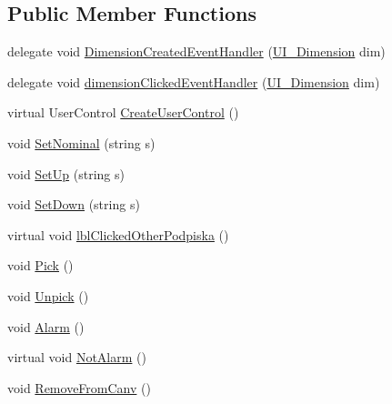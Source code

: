 \subsection*{Public Member Functions}
\begin{DoxyCompactItemize}
\item 
delegate void \mbox{\hyperlink{class_dimension___chain_1_1_u_i___dimension_a106096e0c35875f5fab0e7f22e0b5941}{Dimension\+Created\+Event\+Handler}} (\mbox{\hyperlink{class_dimension___chain_1_1_u_i___dimension}{U\+I\+\_\+\+Dimension}} dim)
\item 
delegate void \mbox{\hyperlink{class_dimension___chain_1_1_u_i___dimension_a45fef985621de3e250d8343eeeca3aed}{dimension\+Clicked\+Event\+Handler}} (\mbox{\hyperlink{class_dimension___chain_1_1_u_i___dimension}{U\+I\+\_\+\+Dimension}} dim)
\item 
virtual User\+Control \mbox{\hyperlink{class_dimension___chain_1_1_u_i___dimension_a7aff55d45ac01c21db9f45583fe5c51c}{Create\+User\+Control}} ()
\item 
void \mbox{\hyperlink{class_dimension___chain_1_1_u_i___dimension_a3e4e1d9c20e13324015ff92665916cd1}{Set\+Nominal}} (string s)
\item 
void \mbox{\hyperlink{class_dimension___chain_1_1_u_i___dimension_a085021a542b0342c1acb0b0f147f1d1a}{Set\+Up}} (string s)
\item 
void \mbox{\hyperlink{class_dimension___chain_1_1_u_i___dimension_a95aaf2a3e9eebd27a6de7c4c2613c362}{Set\+Down}} (string s)
\item 
virtual void \mbox{\hyperlink{class_dimension___chain_1_1_u_i___dimension_a13210c593c5bd0f5e7b59b93f6ec5fdc}{lbl\+Clicked\+Other\+Podpiska}} ()
\item 
void \mbox{\hyperlink{class_dimension___chain_1_1_u_i___dimension_ac655b429f2293b499eb3c597ebd74b95}{Pick}} ()
\item 
void \mbox{\hyperlink{class_dimension___chain_1_1_u_i___dimension_a8d3d92dd9e720171068d5c92220c5669}{Unpick}} ()
\item 
void \mbox{\hyperlink{class_dimension___chain_1_1_u_i___dimension_a3dc1cd92d14d6df43a6a15dd739aa155}{Alarm}} ()
\item 
virtual void \mbox{\hyperlink{class_dimension___chain_1_1_u_i___dimension_a4ab4c36c068571222229db5f0a194dd2}{Not\+Alarm}} ()
\item 
void \mbox{\hyperlink{class_dimension___chain_1_1_u_i___dimension_ae3e15f8c2a0c7b66f6346438a3eae72a}{Remove\+From\+Canv}} ()
\item 

\end{DoxyCompactItemize}
